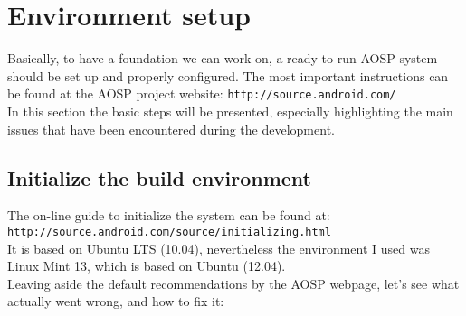 \section{Environment setup}
\label{setup}
Basically, to have a foundation we can work on, a ready-to-run AOSP system should be set up and properly configured. The most important instructions can be found at the AOSP project website: \texttt{http://source.android.com/}\\
In this section the basic steps will be presented, especially highlighting the main issues that have been encountered during the development.
\subsection{Initialize the build environment}
The on-line guide to initialize the system can be found at:\\
\texttt{http://source.android.com/source/initializing.html}\\
It is based on Ubuntu LTS (10.04), nevertheless the environment I used was Linux Mint 13, which is based on Ubuntu (12.04).\\
Leaving aside the default recommendations by the AOSP webpage, let's see what actually went wrong, and how to fix it:

